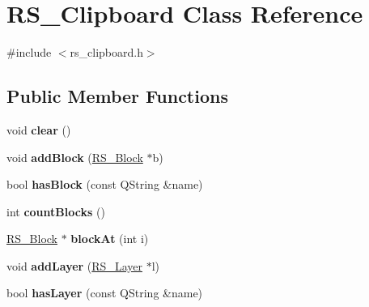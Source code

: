 \hypertarget{classRS__Clipboard}{\section{R\-S\-\_\-\-Clipboard Class Reference}
\label{classRS__Clipboard}
}


{\ttfamily \#include $<$rs\-\_\-clipboard.\-h$>$}

\subsection*{Public Member Functions}
\begin{DoxyCompactItemize}
\item 
\hypertarget{classRS__Clipboard_af89d0d7ffaeb67fd472bf02c3b2d0d5d}{void {\bfseries clear} ()}\label{classRS__Clipboard_af89d0d7ffaeb67fd472bf02c3b2d0d5d}

\item 
\hypertarget{classRS__Clipboard_a3202e7309107d58d96d658af9fdced0c}{void {\bfseries add\-Block} (\hyperlink{classRS__Block}{R\-S\-\_\-\-Block} $\ast$b)}\label{classRS__Clipboard_a3202e7309107d58d96d658af9fdced0c}

\item 
\hypertarget{classRS__Clipboard_abc40e4cd847c6932056268c328121d94}{bool {\bfseries has\-Block} (const Q\-String \&name)}\label{classRS__Clipboard_abc40e4cd847c6932056268c328121d94}

\item 
\hypertarget{classRS__Clipboard_a36ab514640e9a8714ee680fc235f5781}{int {\bfseries count\-Blocks} ()}\label{classRS__Clipboard_a36ab514640e9a8714ee680fc235f5781}

\item 
\hypertarget{classRS__Clipboard_a0545cc36a90bf5fe1c1e6080f1a6b32f}{\hyperlink{classRS__Block}{R\-S\-\_\-\-Block} $\ast$ {\bfseries block\-At} (int i)}\label{classRS__Clipboard_a0545cc36a90bf5fe1c1e6080f1a6b32f}

\item 
\hypertarget{classRS__Clipboard_aa985b4bd83f88a8e9849f4067a92103d}{void {\bfseries add\-Layer} (\hyperlink{classRS__Layer}{R\-S\-\_\-\-Layer} $\ast$l)}\label{classRS__Clipboard_aa985b4bd83f88a8e9849f4067a92103d}

\item 
\hypertarget{classRS__Clipboard_a60af902561a4c5804fef1cc5d8d25ef2}{bool {\bfseries has\-Layer} (const Q\-String \&name)}\label{classRS__Clipboard_a60af902561a4c5804fef1cc5d8d25ef2}


\end{DoxyCompactItemize}
